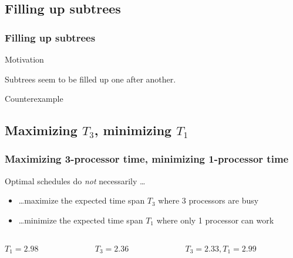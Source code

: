 \documentclass{beamer}
\newenvironment{motivationblock}
{
  \begin{block}{Motivation}
}
{
  \end{block}
}
\newenvironment{counterexampleblock}
{
  \begin{alertblock}{Counterexample}
}
{
  \end{alertblock}
}
\begin{document}
\subsection{Filling up subtrees}

\begin{frame}
  \frametitle{Filling up subtrees}
  \begin{motivationblock}
    Subtrees seem to be filled up one after another.
  \end{motivationblock}
  \begin{counterexampleblock}
    \begin{center}
      
    \end{center}
  \end{counterexampleblock}
\end{frame}

\subsection{Maximizing $T_3$, minimizing $T_1$}

\begin{frame}
  \frametitle{Maximizing 3-processor time, minimizing 1-processor
    time}
  \begin{block}{Optimal schedules do \emph{not} necessarily \dots}
    \begin{itemize}
    \item \dots maximize the expected time span $T_3$ where 3 processors are busy
    \item \dots minimize the expected time span $T_1$ where only 1 processor can work
    \end{itemize}
  \end{block}
  \begin{columns}
    \begin{column}{.3\textwidth}
      \begin{center}
        
        $T_1=2.98$
      \end{center}
    \end{column}
    \begin{column}{.3\textwidth}
      \begin{center}
         
        $T_3=2.36$
      \end{center}
    \end{column}
    \begin{column}{.4\textwidth}
      \begin{center}
         
        $T_3=2.33, T_1=2.99$
      \end{center}
    \end{column}
  \end{columns}
\end{frame}
\end{document}
